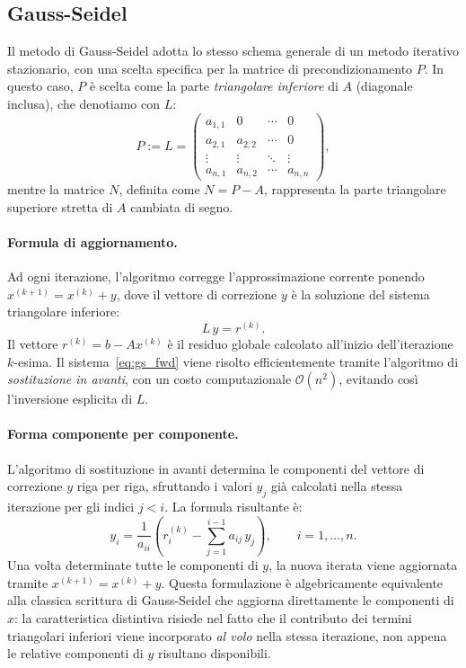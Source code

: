 \documentclass[a4paper,12pt]{article}
\begin{document}
\subsection{Gauss-Seidel}
\label{subsec:gs}
Il metodo di Gauss-Seidel adotta lo stesso schema generale di un metodo iterativo
stazionario, con una scelta specifica per la matrice di precondizionamento $P$. In
questo caso, $P$ è scelta come la parte \emph{triangolare inferiore} di $A$ (diagonale
inclusa), che denotiamo con $L$:
\begin{equation}
    P := L =
    \begin{pmatrix}
        a_{1,1} & 0       & \cdots & 0       \\
        a_{2,1} & a_{2,2} & \cdots & 0       \\
        \vdots  & \vdots  & \ddots & \vdots  \\
        a_{n,1} & a_{n,2} & \cdots & a_{n,n}
    \end{pmatrix},
\end{equation}
mentre la matrice $N$, definita come $N = P - A$, rappresenta la parte triangolare
superiore stretta di $A$ cambiata di segno.

\paragraph{Formula di aggiornamento.}
Ad ogni iterazione, l'algoritmo corregge l'approssimazione corrente ponendo
$x^{(k+1)} = x^{(k)} + y$, dove il vettore di correzione $y$ è la soluzione del
sistema triangolare inferiore:
\begin{equation}
    L\, y = r^{(k)}.
    \label{eq:gs_fwd}
\end{equation}
Il vettore $r^{(k)} = b - Ax^{(k)}$ è il residuo globale calcolato all'inizio
dell'iterazione $k$-esima. Il sistema~\eqref{eq:gs_fwd} viene risolto efficientemente
tramite l'algoritmo di \emph{sostituzione in avanti}, con un costo computazionale
$\mathcal{O}(n^2)$, evitando così l'inversione esplicita di $L$.

\paragraph{Forma componente per componente.}
L'algoritmo di sostituzione in avanti determina le componenti del vettore di
correzione $y$ riga per riga, sfruttando i valori $y_j$ già calcolati nella stessa
iterazione per gli indici $j < i$. La formula risultante è:
\begin{equation}
    y_i = \frac{1}{a_{ii}} \left( r_i^{(k)} - \sum_{j=1}^{i-1} a_{ij}\, y_j \right),
    \qquad i = 1,\dots,n.
    \label{eq:gs_comp_corr}
\end{equation}
Una volta determinate tutte le componenti di $y$, la nuova iterata viene aggiornata
tramite $x^{(k+1)} = x^{(k)} + y$. Questa formulazione è algebricamente equivalente
alla classica scrittura di Gauss-Seidel che aggiorna direttamente le componenti di
$x$: la caratteristica distintiva risiede nel fatto che il contributo dei termini
triangolari inferiori viene incorporato \emph{al volo} nella stessa iterazione, non
appena le relative componenti di $y$ risultano disponibili.
\end{document}
